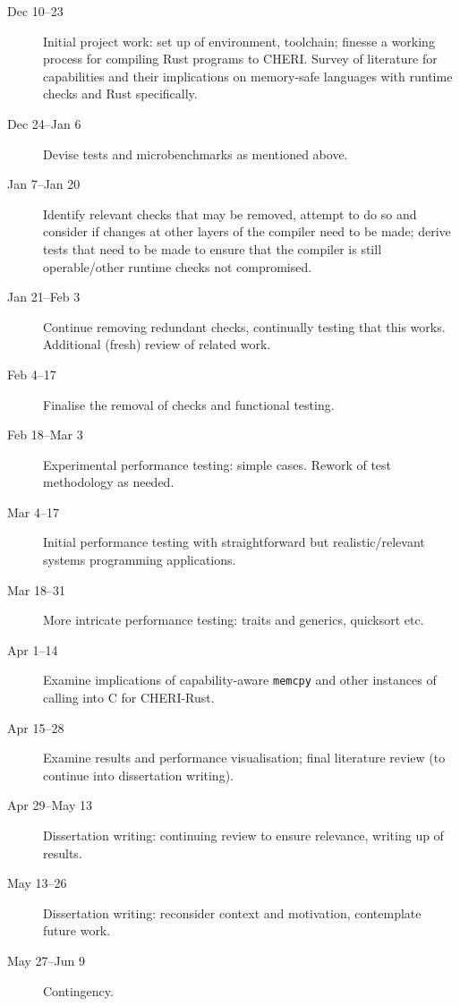 \documentclass[11pt]{article}
\begin{document}
\begin{description}
  \item [Dec 10--23] Initial project work: set up of environment, toolchain; finesse a working process for compiling Rust programs to CHERI. Survey of literature for capabilities and their implications on memory-safe languages with runtime checks and Rust specifically.
  \item [Dec 24--Jan 6] Devise tests and microbenchmarks as mentioned above.
  \item [Jan 7--Jan 20] Identify relevant checks that may be removed, attempt to do so and consider if changes at other layers of the compiler need to be made; derive tests that need to be made to ensure that the compiler is still operable/other runtime checks not compromised.
  \item [Jan 21--Feb 3] Continue removing redundant checks, continually testing that this works. Additional (fresh) review of related work.
  \item [Feb 4--17]  Finalise the removal of checks and functional testing.
  \item [Feb 18--Mar 3] Experimental performance testing: simple cases. Rework of test methodology as needed.
  \item [Mar 4--17] Initial performance testing with straightforward but realistic/relevant systems programming applications.
  \item [Mar 18--31] More intricate performance testing: traits and generics, quicksort etc.
  \item [Apr 1--14] Examine implications of capability-aware \texttt{memcpy} and other instances of calling into C for CHERI-Rust.
  \item [Apr 15--28] Examine results and performance visualisation; final literature review (to continue into dissertation writing).
  \item [Apr 29--May 13] Dissertation writing: continuing review to ensure relevance, writing up of results.
  \item [May 13--26] Dissertation writing: reconsider context and motivation, contemplate future work.
  \item [May 27--Jun 9] Contingency.
\end{description}




\newpage
\appendix
\end{document}
